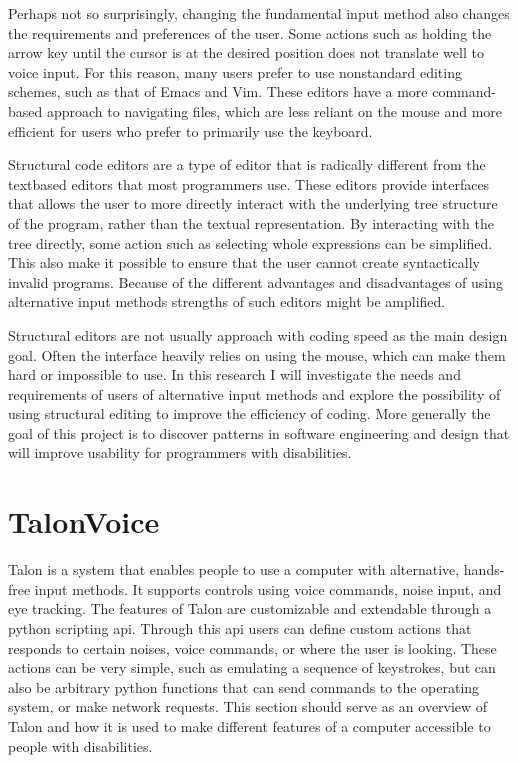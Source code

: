 \documentclass[a4paper,english]{ifimaster}
\begin{document}

Perhaps not so surprisingly, changing the fundamental input method also changes the requirements and preferences of the user.
Some actions such as holding the arrow key until the cursor is at the desired position does not translate well to voice input.
For this reason, many users prefer to use nonstandard editing schemes, such as that of Emacs and Vim.
These editors have a more command-based approach to navigating files, which are less reliant on the mouse
and more efficient for users who prefer to primarily use the keyboard.

Structural code editors are a type of editor that is radically different from the textbased editors that most programmers use.
These editors provide interfaces that allows the user to more directly interact with the underlying tree structure of the program,
rather than the textual representation.
By interacting with the tree directly, some action such as selecting whole expressions can be simplified.
This also make it possible to ensure that the user cannot create syntactically invalid programs.
Because of the different advantages and disadvantages of using alternative input methods strengths of such editors 
might be amplified.

Structural editors are not usually approach with coding speed as the main design goal.
Often the interface heavily relies on using the mouse, which can make them hard or impossible to use.
In this research I will investigate the needs and requirements of users of alternative input methods
and explore the possibility of using structural editing to improve the efficiency of coding.
More generally the goal of this project is to discover patterns in software engineering and design
that will improve usability for programmers with disabilities.

\section{TalonVoice}
Talon is a system that enables people to use a computer with alternative, hands-free input methods.
It supports controls using voice commands, noise input, and eye tracking.
The features of Talon are customizable and extendable through a python scripting api.
Through this api users can define custom actions that responds to certain noises, voice commands, or where the user is looking.
These actions can be very simple, such as emulating a sequence of keystrokes, but can also be arbitrary python functions
that can send commands to the operating system, or make network requests.
This section should serve as an overview of Talon and how it is used to make different features of a computer accessible to people with disabilities.
\end{document}
